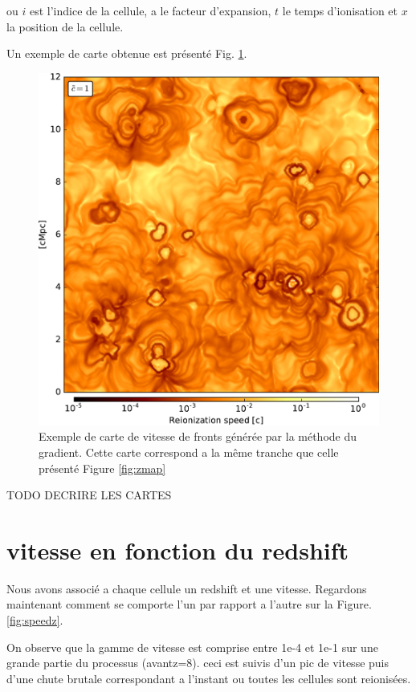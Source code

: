ou $i$ est l'indice de la cellule, a le facteur d'expansion, $t$ le temps d'ionisation et $x$  la position de la cellule.

Un exemple de carte obtenue est présenté Fig. \ref{fig:vmap}.

\begin{figure}[htpb]
        \includegraphics[width=.95\linewidth]{img/04_mapreio/map_v_c1.pdf} 
        \caption{Exemple de carte de vitesse de fronts générée par la méthode du gradient.
		 Cette carte correspond a la même tranche que celle présenté Figure \ref{fig:zmap}
        }
 		\label{fig:vmap}
\end{figure}

TODO DECRIRE LES CARTES\\

\section{vitesse en fonction du redshift}
Nous avons associé a chaque cellule un redshift et une vitesse.
Regardons maintenant comment se comporte l'un par rapport a l'autre sur la Figure. \ref{fig:speedz}.

On observe que la gamme de vitesse est comprise entre 1e-4 et 1e-1 sur une grande partie du processus (avantz=8).
ceci est suivis d'un pic de vitesse puis d'une chute brutale correspondant a l'instant ou toutes les cellules sont reionisées.

